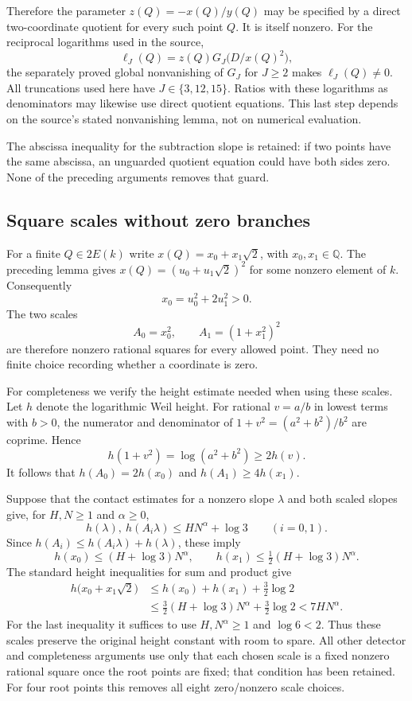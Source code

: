 Therefore the parameter $z(Q)=-x(Q)/y(Q)$ may be specified by a
direct two-coordinate quotient for every such point $Q$.  It is
itself nonzero.  For the reciprocal logarithms used in the source,
\[
              \ell_J(Q)=z(Q)G_J\bigl(D/x(Q)^2\bigr),
\]
the separately proved global nonvanishing of $G_J$ for $J\ge2$
makes $\ell_J(Q)\ne0$.  All truncations used here have
$J\in\{3,12,15\}$.  Ratios with these logarithms as denominators
may likewise use direct quotient equations.  This last step depends
on the source's stated nonvanishing lemma, not on numerical evaluation.

The abscissa inequality for the subtraction slope is retained: if two
points have the same abscissa, an unguarded quotient equation could have
both sides zero.  None of the preceding arguments removes that guard.

\subsection{Square scales without zero branches}
\label{subsec:square-scales-without-branches}

For a finite $Q\in2E(k)$ write $x(Q)=x_0+x_1\sqrt2$, with
$x_0,x_1\in\mathbb Q$.  The preceding lemma gives
$x(Q)=(u_0+u_1\sqrt2)^2$ for some nonzero element of $k$.
Consequently
\[
                    x_0=u_0^2+2u_1^2>0.
\]
The two scales
\[
                    A_0=x_0^2,\qquad A_1=(1+x_1^2)^2
\]
are therefore nonzero rational squares for every allowed point.  They
need no finite choice recording whether a coordinate is zero.

For completeness we verify the height estimate needed when using these
scales.  Let $h$ denote the logarithmic Weil height.  For rational
$v=a/b$ in lowest terms with $b>0$, the numerator and denominator
of $1+v^2=(a^2+b^2)/b^2$ are coprime.  Hence
\[
         h(1+v^2)=\log(a^2+b^2)\ge2h(v).
\]
It follows that $h(A_0)=2h(x_0)$ and $h(A_1)\ge4h(x_1)$.

Suppose that the contact estimates for a nonzero slope $\lambda$ and
both scaled slopes give, for $H,N\ge1$ and $\alpha\ge0$,
\[
 h(\lambda),\ h(A_i\lambda)\le HN^\alpha+\log3
                                      \qquad(i=0,1).
\]
Since $h(A_i)\le h(A_i\lambda)+h(\lambda)$, these imply
\[
 h(x_0)\le(H+\log3)N^\alpha,\qquad
 h(x_1)\le\tfrac12(H+\log3)N^\alpha.
\]
The standard height inequalities for sum and product give
\[
 \begin{aligned}
 h\bigl(x_0+x_1\sqrt2\bigr)
 &\le h(x_0)+h(x_1)+\tfrac32\log2\\
 &\le\tfrac32(H+\log3)N^\alpha+\tfrac32\log2
   <7HN^\alpha.
 \end{aligned}
\]
For the last inequality it suffices to use $H,N^\alpha\ge1$ and
$\log6<2$.  Thus these scales preserve the original height constant
with room to spare.  All other detector and completeness arguments use
only that each chosen scale is a fixed nonzero rational square once the
root points are fixed; that condition has been retained.  For four root
points this removes all eight zero/nonzero scale choices.
